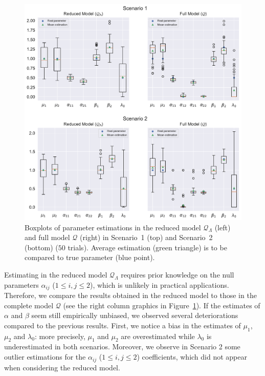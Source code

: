       \begin{figure}[!ht]
        \centering
        \includegraphics[width=\linewidth]{images/chapter4//column_triangle_model_estimation.pdf}
        \caption{Boxplots of parameter estimations in the reduced model $\mathcal{Q}_{\Lambda}$ (left) and full model $\mathcal{Q}$ (right)
        in Scenario~1 (top) and Scenario~2 (bottom) ($50$ trials).
        Average estimation (green triangle) is to be compared to true parameter (blue point).}
        \label{fig:chap3_column_triangle_model_estimation}
      \end{figure}
            
            Estimating in the reduced model $\mathcal Q_\Lambda$ requires prior knowledge on the null parameters $\alpha_{ij}$ ($1 \le i, j \le 2$), which is unlikely in practical applications. Therefore, we compare the results obtained in the reduced model to those in the complete model $\mathcal Q$ (see the right column graphics in Figure~\ref{fig:chap3_column_triangle_model_estimation}). If the estimates of $\alpha$ and $\beta$ seem still empirically unbiased, we observed several deteriorations compared to the previous results. First, we notice a bias in the estimates of $\mu_1$, $\mu_2$ and $\lambda_0$: more precisely, $\mu_1$ and $\mu_2$ are overestimated while $\lambda_0$ is underestimated in both scenarios. Moreover, we observe in Scenario 2 some outlier estimations for the $\alpha_{ij}$ ($1 \le i, j \le 2$) coefficients, which did not appear when considering the reduced model. 
		
